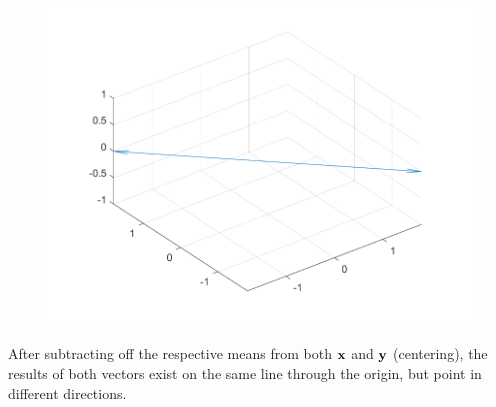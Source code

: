 \begin{enumerate}[label=(\alph*)]
        \begin{figure}[H]
            \centering
            \includegraphics[scale=0.5]{./matlab/chapter-2/sol2.1c.png}
        \end{figure}

        After subtracting off the respective means from both $\bold{x}$ and $\bold{y}$ (centering), the results of both vectors exist on the same line through the origin, but point in different directions.
            
        \end{enumerate} 